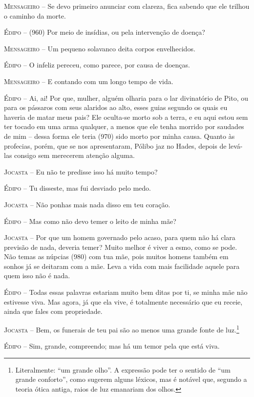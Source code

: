 \textsc{Mensageiro} --   Se devo primeiro anunciar com clareza, fica sabendo que ele trilhou o
caminho da morte.

\textsc{Édipo} --   (960) Por meio de insídias, ou pela intervenção de doença?

\textsc{Mensageiro} --   Um pequeno solavanco deita corpos envelhecidos.

\textsc{Édipo} --   O infeliz pereceu, como parece, por causa de doenças.

\textsc{Mensageiro} --   E contando com um longo tempo de vida.

\textsc{Édipo} --   Ai, ai! Por que, mulher, alguém olharia para o lar divinatório de Pito,
ou para os pássaros com seus alaridos ao alto, esses guias segundo os
quais eu haveria de matar meus pais? Ele oculta-se morto sob a terra, e
eu aqui estou sem ter tocado em uma arma qualquer, a menos que ele tenha
morrido por saudades de mim -- dessa forma ele teria (970) sido morto por
minha causa. Quanto às profecias, porém, que se nos apresentaram, Pólibo
jaz no Hades, depois de levá-las consigo sem merecerem atenção alguma.

\textsc{Jocasta} --   Eu não te predisse isso há muito tempo?

\textsc{Édipo} --   Tu disseste, mas fui desviado pelo medo.

\textsc{Jocasta} --   Não ponhas mais nada disso em teu coração.

\textsc{Édipo} --   Mas como não devo temer o leito de minha mãe?

\textsc{Jocasta} --   Por que um homem governado pelo acaso, para quem não há clara previsão
de nada, deveria temer? Muito melhor é viver a esmo, como se pode. Não
temas as núpcias (980) com tua mãe, pois muitos homens também em sonhos
já se deitaram com a mãe. Leva a vida com mais facilidade aquele para
quem isso não é nada.

\textsc{Édipo} --   Todas essas palavras estariam muito bem ditas por ti, se minha mãe não
estivesse viva. Mas agora, já que ela vive, é totalmente necessário que
eu receie, ainda que fales com propriedade.

\textsc{Jocasta} --   Bem, os funerais de teu pai são ao menos uma grande fonte de
luz.\footnote{Literalmente: ``um grande olho''. A expressão pode ter o
  sentido de ``um grande conforto'', como sugerem alguns léxicos, mas é
  notável que, segundo a teoria ótica antiga, raios de luz emanariam dos
  olhos.}

\textsc{Édipo} --   Sim, grande, compreendo; mas há um temor pela que está viva.

